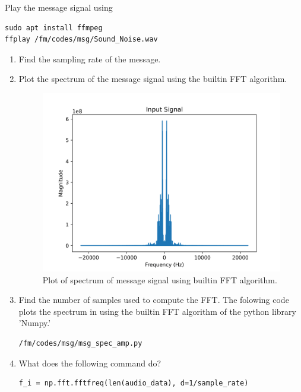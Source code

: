 Play the message signal using
\begin{lstlisting}
sudo apt install ffmpeg
ffplay /fm/codes/msg/Sound_Noise.wav
\end{lstlisting}
\begin{enumerate}[label=\arabic*.,ref=\thesection.\theenumi]
\item Find the sampling rate of the message.
\item Plot the spectrum of the message signal using the builtin FFT algorithm.\\
	\solution		
\begin{figure}[H]
\centering
\includegraphics[width=\columnwidth]{fm/msg/figs/FFTbuiltin/inputs-1.png}
\caption{Plot of spectrum of message signal using builtin FFT algorithm.}
\label{fig:FFTb}
\end{figure}
\item Find the number of samples used to compute the FFT.
The folowing code plots the spectrum in  using the builtin FFT algorithm of the python library 'Numpy.'
\begin{lstlisting}
/fm/codes/msg/msg_spec_amp.py
\end{lstlisting}
\item What does the following command do?
\begin{lstlisting}
f_i = np.fft.fftfreq(len(audio_data), d=1/sample_rate)
\end{lstlisting}


\end{enumerate}
